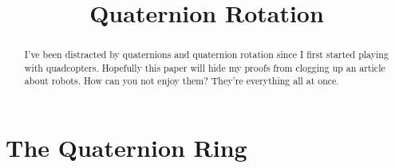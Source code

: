 \documentclass{amsart}
\theoremstyle{definition}
\theoremstyle{remark}
\numberwithin{equation}{section}
\begin{document}
\title{Quaternion Rotation}

\begin{abstract}
I've been distracted by quaternions and quaternion rotation since I first started playing with quadcopters. Hopefully this paper will hide my proofs from clogging up an article about robots. How can you not enjoy them? They're everything all at once.
\end{abstract}

\maketitle


\section{The Quaternion Ring}
\end{document}
